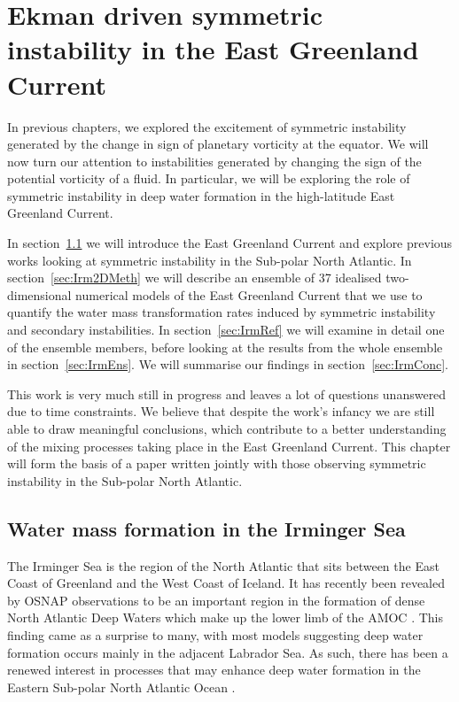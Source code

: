 \chapter{Ekman driven symmetric instability in the East Greenland Current}
\label{chap:5}

In previous chapters, we explored the excitement of symmetric instability generated by the change in sign of planetary vorticity at the equator. We will now turn our attention to instabilities generated by changing the sign of the potential vorticity of a fluid. In particular, we will be exploring the role of symmetric instability in deep water formation in the high-latitude East Greenland Current.

In section~\ref{sec:IrmIntro} we will introduce the East Greenland Current and explore previous works looking at symmetric instability in the Sub-polar North Atlantic. In section~\ref{sec:Irm2DMeth} we will describe an ensemble of 37 idealised two-dimensional numerical models of the East Greenland Current that we use to quantify the water mass transformation rates induced by symmetric instability and secondary instabilities. In section~\ref{sec:IrmRef} we will examine in detail one of the ensemble members, before looking at the results from the whole ensemble in section~\ref{sec:IrmEns}. We will summarise our findings in section~\ref{sec:IrmConc}.

This work is very much still in progress and leaves a lot of questions unanswered due to time constraints. We believe that despite the work's infancy we are still able to draw meaningful conclusions, which contribute to a better understanding of the mixing processes taking place in the East Greenland Current. This chapter will form the basis of a paper written jointly with those observing symmetric instability in the Sub-polar North Atlantic.

\section{Water mass formation in the Irminger Sea}
\label{sec:IrmIntro}
The Irminger Sea is the region of the North Atlantic that sits between the East Coast of Greenland and the West Coast of Iceland. It has recently been revealed by OSNAP observations to be an important region in the formation of dense North Atlantic Deep Waters which make up the lower limb of the AMOC \citep{Lozier2019}. This finding came as a surprise to many, with most models suggesting deep water formation occurs mainly in the adjacent Labrador Sea. As such, there has been a renewed interest in processes that may enhance deep water formation in the Eastern Sub-polar North Atlantic Ocean \citep[e.g.][]{Josey2019, LeBras2022, DeJong2016}.

